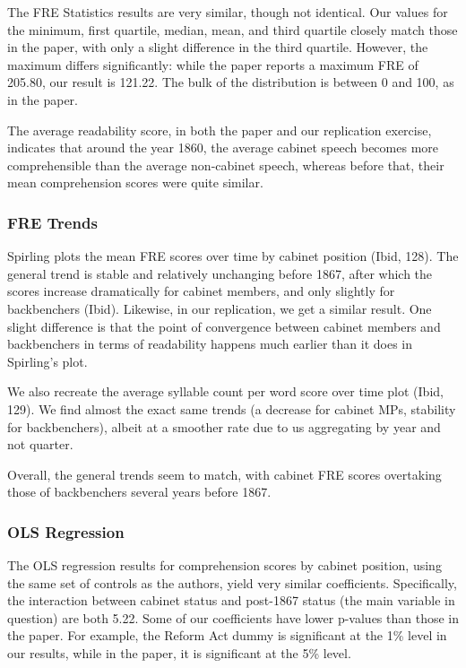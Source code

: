 \documentclass[
  letterpaper,
  DIV=11,
  numbers=noendperiod]{scrartcl}
\begin{document}
The FRE Statistics results are very similar, though not identical. Our
values for the minimum, first quartile, median, mean, and third quartile
closely match those in the paper, with only a slight difference in the
third quartile. However, the maximum differs significantly: while the
paper reports a maximum FRE of 205.80, our result is 121.22. The bulk of
the distribution is between 0 and 100, as in the paper.

The average readability score, in both the paper and our replication
exercise, indicates that around the year 1860, the average cabinet
speech becomes more comprehensible than the average non-cabinet speech,
whereas before that, their mean comprehension scores were quite similar.

\subsubsection{FRE Trends}\label{fre-trends}

Spirling plots the mean FRE scores over time by cabinet position (Ibid,
128). The general trend is stable and relatively unchanging before 1867,
after which the scores increase dramatically for cabinet members, and
only slightly for backbenchers (Ibid). Likewise, in our replication, we
get a similar result. One slight difference is that the point of
convergence between cabinet members and backbenchers in terms of
readability happens much earlier than it does in Spirling's plot.

We also recreate the average syllable count per word score over time
plot (Ibid, 129). We find almost the exact same trends (a decrease for
cabinet MPs, stability for backbenchers), albeit at a smoother rate due
to us aggregating by year and not quarter.~

Overall, the general trends seem to match, with cabinet FRE scores
overtaking those of backbenchers several years before 1867.

\subsubsection{OLS Regression}\label{ols-regression}

The OLS regression results for comprehension scores by cabinet position,
using the same set of controls as the authors, yield very similar
coefficients. Specifically, the interaction between cabinet status and
post-1867 status (the main variable in question) are both 5.22. Some of
our coefficients have lower p-values than those in the paper. For
example, the Reform Act dummy is significant at the 1\% level in our
results, while in the paper, it is significant at the 5\% level.
\end{document}
